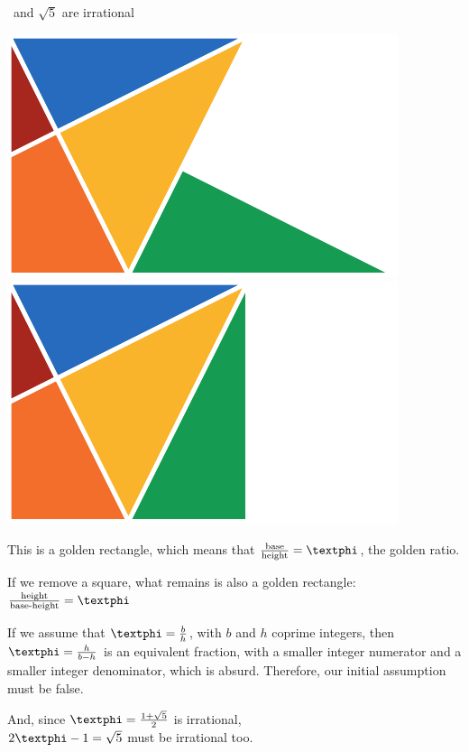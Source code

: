 \documentclass[14pt]{beamer}
\begin{document}
    \begin{frame}{\textphi\ and $\sqrt{5}$ are irrational}
        \begin{center}
            \begin{minipage}{0.45\textwidth}%
                \includegraphics[scale=0.750]{figures/figure030a.pdf} \\[2ex]
                \includegraphics[scale=0.750]{figures/figure030b.pdf} \\
            \end{minipage}\hfill\begin{minipage}{0.5\textwidth}
                \footnotesize
                This is a golden rectangle, which means that $\tfrac{\text{base}}{\text{height}} = \text{\textphi}$, the golden ratio.\bigskip

                If we remove a square, what remains is also a golden rectangle: $\tfrac{\text{height}}{\text{base-height}} = \text{\textphi}$\bigskip

                If we assume that $\text{\textphi} = \tfrac{b}{h}$, with $b$ and $h$ coprime integers, then $\text{\textphi} = \tfrac{h}{b-h}$ is an equivalent fraction, with a smaller integer numerator and a smaller integer denominator, which is absurd. Therefore, our initial assumption must be false.\bigskip

                And, since $\text{\textphi} =\tfrac{1+\sqrt{5}}{2}$ is irrational,\\[0.25ex]$2\text{\textphi} - 1 = \sqrt{5}$ must be irrational too.
            \end{minipage}
        \end{center}
    \end{frame}
\end{document}
